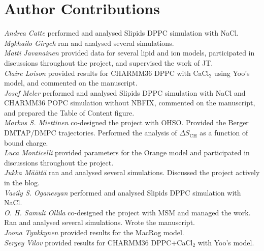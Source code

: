 \documentclass[twoside,twocolumn,9pt]{article}
\begin{document}
\section{Author Contributions}
\noindent 
{\it Andrea Catte} performed and analysed Slipids DPPC simulation with NaCl. \\
{\it Mykhailo Girych} ran and analysed several simulations. \\
{\it Matti Javanainen} provided data for several lipid and ion models, participated in discussions throughout the project, and supervised the work of JT. \\
{\it Claire Loison} provided results for CHARMM36 DPPC with CaCl$_{2}$ using Yoo's model, and commented on the manuscript. \\
{\it Josef Melcr} performed and analysed Slipids DPPC simulation with NaCl and CHARMM36 POPC simulation without NBFIX, commented on the manuscript, and prepared the Table of Content figure. \\
{\it Markus S. Miettinen} co-designed the project with OHSO.  Provided the Berger DMTAP/DMPC trajectories. Performed the analysis of $\Delta S_\mathrm{CH}$ as a function of bound charge.\\
{\it Luca Monticelli} provided parameters for the Orange model and participated in discussions throughout the project. \\
{\it Jukka M{\"a}{\"a}tt{\"a}} ran and analysed several simulations. Discussed the project actively in the blog. \\
{\it Vasily S. Oganesyan} performed and analysed Slipids DPPC simulation with NaCl.\\
{\it O. H. Samuli Ollila} co-designed the project with MSM and managed the work. Ran and analysed several simulations. Wrote the manuscript. \\
{\it Joona Tynkkynen } provided results for the MacRog model. \\
{\it Sergey Vilov} provided results for CHARMM36 DPPC+CaCl$_{2}$ with Yoo's model. \\


\end{document}
